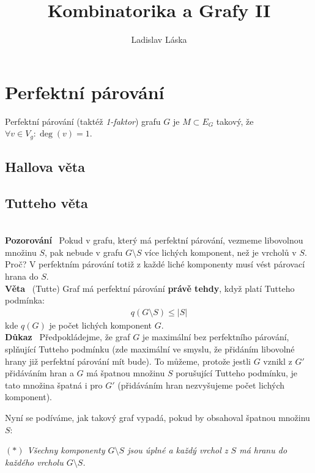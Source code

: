 \documentclass{article}
\title{Kombinatorika a Grafy II}
\author{Ladislav Láska}
\renewcommand{\paragraph}[1]{\ \\\smallskip\noindent\textbf{#1}\ }
\begin{document}
\maketitle
\tableofcontents
\newpage

\section{Perfektní párování}
Perfektní párování (taktéž {\it 1-faktor}) grafu $G$ je $M \subset E_G$ takový, 
že $\forall v \in V_g: \deg(v) = 1$.
\subsection{Hallova věta}
\subsection{Tutteho věta}
\paragraph{Pozorování}
Pokud v grafu, který má perfektní párování, vezmeme libovolnou množinu $S$, pak 
nebude v grafu $G\setminus S$ více lichých komponent, než je vrcholů v $S$.  
Proč? V perfektním párování totiž z každé liché komponenty musí vést párovací 
hrana do $S$.
\paragraph{Věta} (Tutte) Graf má perfektní párování \textbf{právě tehdy}, když 
platí Tutteho podmínka:
\begin{align}
	q(G\setminus S) \leq |S|
\end{align}
kde $q(G)$ je počet lichých komponent $G$.
\paragraph{Důkaz}
Předpokládejme, že graf $G$ je maximální bez perfektního párování, splňující 
Tutteho podmínku (zde maximální ve smyslu, že přidáním libovolné hrany již 
perfektní párování mít bude). To můžeme, protože jestli $G$ vznikl z $G'$ 
přidáváním hran a $G$ má špatnou množinu $S$ porušující Tutteho podmínku, je 
tato množina špatná i pro $G'$ (přidáváním hran nezvyšujeme počet lichých 
komponent).

Nyní se podíváme, jak takový graf vypadá, pokud by obsahoval špatnou množinu 
$S$:

\bigskip

\centerline{\it $(*)$ Všechny komponenty $G\setminus S$ jsou úplné a každý 
vrchol z $S$ má hranu do každého vrcholu $G\setminus S$.}
\end{document}
